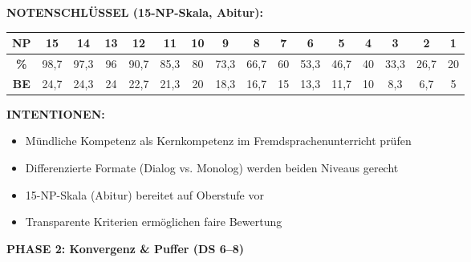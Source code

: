 \documentclass[11pt, a4paper]{article}
\begin{document}
\begin{assessmentbox}[title={DS 5 -- ASSESSMENT (Mo, 19.01.2026)}]
\vspace{0.2cm}

\textbf{NOTENSCHLÜSSEL (15-NP-Skala, Abitur):}

\begin{center}
\footnotesize
\begin{tabular}{|c|c|c|c|c|c|c|c|c|c|c|c|c|c|c|c|}
\hline
\textbf{NP} & 15 & 14 & 13 & 12 & 11 & 10 & 9 & 8 & 7 & 6 & 5 & 4 & 3 & 2 & 1 \\
\hline
\textbf{\%} & 98,7 & 97,3 & 96 & 90,7 & 85,3 & 80 & 73,3 & 66,7 & 60 & 53,3 & 46,7 & 40 & 33,3 & 26,7 & 20 \\
\hline
\textbf{BE} & 24,7 & 24,3 & 24 & 22,7 & 21,3 & 20 & 18,3 & 16,7 & 15 & 13,3 & 11,7 & 10 & 8,3 & 6,7 & 5 \\
\hline
\end{tabular}
\end{center}

\vspace{0.2cm}

\textbf{INTENTIONEN:}
\begin{itemize}[leftmargin=1.5em, nosep]
    \item Mündliche Kompetenz als Kernkompetenz im Fremdsprachenunterricht prüfen
    \item Differenzierte Formate (Dialog vs. Monolog) werden beiden Niveaus gerecht
    \item 15-NP-Skala (Abitur) bereitet auf Oberstufe vor
    \item Transparente Kriterien ermöglichen faire Bewertung
\end{itemize}

\end{assessmentbox}

\vspace{0.5cm}


\textbf{\Large\color{spanisch} PHASE 2: Konvergenz \& Puffer (DS 6--8)}

\vspace{0.3cm}
\end{document}
